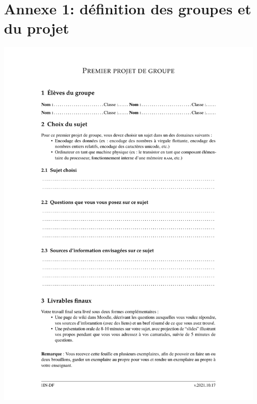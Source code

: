 \documentclass[11pt,bibliography=totoc]{scrartcl}
\begin{document}
\section*{Annexe 1: définition des groupes et du projet} %
\includegraphics[width=.95\textwidth]{annexes/projet1.pdf}
\end{document}
